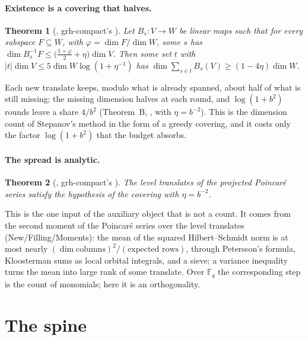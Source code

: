 \documentclass[11pt]{article}
\newtheorem{theorem}{Theorem}[section]
\theoremstyle{definition}
\theoremstyle{remark}
\begin{document}
\paragraph{Existence is a covering that halves.}
\begin{theorem}[, grh-compact's ]
Let $B_s\colon V\to W$ be linear maps such that for every subspace $F\subseteq W$, with
$\varphi=\dim F/\dim W$, some $s$ has $\dim B_s^{-1}F\le\bigl(\tfrac{1+\varphi}2+\eta\bigr)\dim V$.
Then some set $t$ with $|t|\dim V\le5\dim W\log(1+\eta^{-1})$ has
$\dim\sum_{s\in t}B_s(V)\ge(1-4\eta)\dim W$.
\end{theorem}
Each new translate keeps, modulo what is already spanned, about half of what is still missing; the
missing dimension halves at each round, and $\log(1+b^2)$ rounds leave a share $4/b^2$ (Theorem~B,
, with $\eta=b^{-2}$). This is the dimension count of Stepanov's method in
the form of a greedy covering, and it costs only the factor $\log(1+b^2)$ that the budget
absorbs.

\paragraph{The spread is analytic.}
\begin{theorem}[, grh-compact's
]
The level translates of the projected Poincaré series satisfy the hypothesis of the covering with
$\eta=b^{-2}$.
\end{theorem}
This is the one input of the auxiliary object that is not a count. It comes from the second moment
of the Poincaré series over the level translates (New/Filling/Moments): the mean of the squared
Hilbert--Schmidt norm is at most nearly $(\dim\text{columns})^2/(\text{expected rows})$, through
Petersson's formula, Kloosterman sums as local orbital integrals, and a sieve; a variance
inequality turns the mean into large rank of some translate. Over $\mathbb F_q$ the corresponding
step is the count of monomials; here it is an orthogonality.

\section{The spine}\label{sec:spine}
\end{document}
